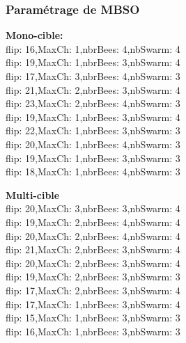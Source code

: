 \subsubsection{Paramétrage de MBSO}
\noindent
\begin{minipage}[t]{0.55\textwidth}
	\textbf{Mono-cible:} \\
	flip: 16,MaxCh: 1,nbrBees: 4,nbSwarm: 4\\
	flip: 19,MaxCh: 1,nbrBees: 3,nbSwarm: 4\\
	flip: 17,MaxCh: 3,nbrBees: 4,nbSwarm: 3\\
	flip: 21,MaxCh: 2,nbrBees: 3,nbSwarm: 4\\
	flip: 23,MaxCh: 2,nbrBees: 4,nbSwarm: 3\\
	flip: 19,MaxCh: 1,nbrBees: 3,nbSwarm: 4\\
	flip: 22,MaxCh: 1,nbrBees: 3,nbSwarm: 3\\
	flip: 20,MaxCh: 1,nbrBees: 4,nbSwarm: 3\\
	flip: 19,MaxCh: 1,nbrBees: 3,nbSwarm: 3\\
	flip: 18,MaxCh: 1,nbrBees: 4,nbSwarm: 3\\
\end{minipage}\hfill
\hspace{0.2cm}
\begin{minipage}[t]{0.55\textwidth}
	\textbf{Multi-cible}\\
	flip: 20,MaxCh: 3,nbrBees: 3,nbSwarm: 4\\
	flip: 19,MaxCh: 2,nbrBees: 4,nbSwarm: 4\\
	flip: 20,MaxCh: 2,nbrBees: 4,nbSwarm: 4\\
	flip: 21,MaxCh: 2,nbrBees: 3,nbSwarm: 4\\
	flip: 20,MaxCh: 2,nbrBees: 3,nbSwarm: 4\\
	flip: 19,MaxCh: 2,nbrBees: 3,nbSwarm: 3\\
	flip: 17,MaxCh: 2,nbrBees: 3,nbSwarm: 4\\
	flip: 17,MaxCh: 1,nbrBees: 3,nbSwarm: 4\\
	flip: 15,MaxCh: 1,nbrBees: 3,nbSwarm: 3\\
	flip: 16,MaxCh: 1,nbrBees: 3,nbSwarm: 3\\
\end{minipage}\hfill




